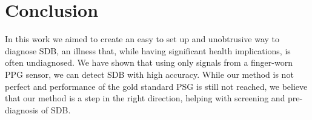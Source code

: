\chapter{Conclusion \label{Chapter-Conclusion}}

In this work we aimed to create an easy to set up and unobtrusive way to diagnose SDB, an illness that, while having significant health implications, is often undiagnosed. We have shown that using only signals from a finger-worn PPG sensor, we can detect SDB with high accuracy. While our method is not perfect and performance of the gold standard PSG is still not reached, we believe that our method is a step in the right direction, helping with screening and pre-diagnosis of SDB.

